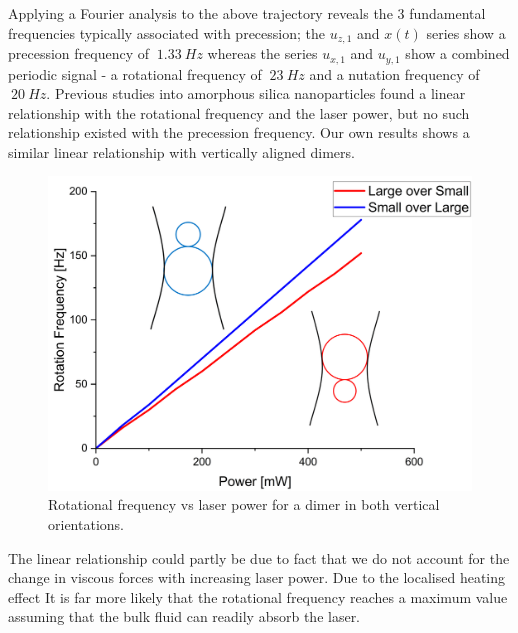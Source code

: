 Applying a Fourier analysis to the above trajectory reveals the 3 fundamental
frequencies typically associated with precession; the $u_{z,1}$ and $x(t)$ 
series show a precession frequency of $~1.33\ Hz$ whereas the series $u_{x,1}$ 
and $u_{y,1}$ show a combined periodic signal - a rotational frequency of 
$~23\ Hz$ and a nutation frequency of $~20\ Hz$. Previous studies into 
amorphous silica nanoparticles found a linear relationship with the 
rotational frequency and the laser power, but no such relationship existed 
with the precession frequency. Our own results shows a similar linear 
relationship with vertically aligned dimers.
\begin{figure}
	\includegraphics[width=\linewidth]{RotationvsPower.png}
	\caption{Rotational frequency vs laser power for a dimer in both vertical orientations.}
\end{figure}

The linear relationship could partly be due to fact that we do not
account for the change in viscous forces with increasing laser power. 
Due to the localised heating effect 
It is far more likely that the rotational frequency reaches a maximum 
value assuming that the bulk fluid can readily absorb the laser.

